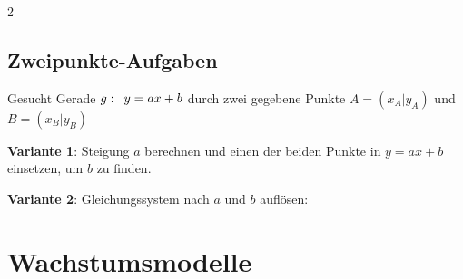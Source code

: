 \begin{multicols}{2}

\subsection*{Zweipunkte-Aufgaben}


Gesucht Gerade $g\-: \,\,\, y=ax+b$ durch zwei gegebene Punkte $A=(x_A|y_A)$ und $B=(x_B|y_B)$


\textbf{Variante 1}: Steigung $a$ berechnen und einen der beiden Punkte in
$y=ax+b$ einsetzen, um $b$ zu finden.


\textbf{Variante 2}: Gleichungssystem nach $a$ und $b$ auf\/lösen:


\end{multicols}
\headerUndFooterJedeSeite{}
\newpage
\headerUndFooterJedeSeite{}




\section*{Wachstumsmodelle}

